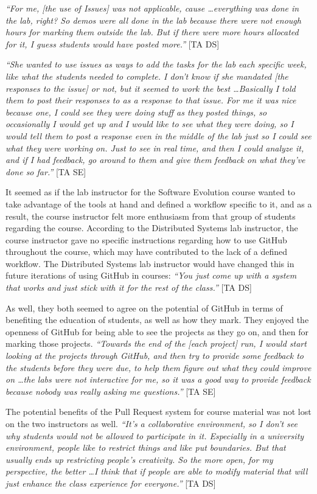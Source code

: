 \textit{``For me, [the use of Issues] was not applicable, cause \ldots everything was done in the lab, right? So demos were all done in the lab because there were not enough hours for marking them outside the lab. But if there were more hours allocated for it, I guess students would have posted more.''} [TA DS]

\textit{``She wanted to use issues as ways to add the tasks for the lab each specific week, like what the students needed to complete. I don't know if she mandated [the responses to the issue] or not, but it seemed to work the best \ldots Basically I told them to post their responses to as a response to that issue. For me it was nice because one, I could see they were doing stuff as they posted things, so occasionally I would get up and I would like to see what they were doing, so I would tell them to post a response even in the middle of the lab just so I could see what they were working on. Just to see in real time, and then I could analyze it, and if I had feedback, go around to them and give them feedback on what they've done so far.''} [TA SE]

It seemed as if the lab instructor for the Software Evolution course wanted to take advantage of the tools at hand and defined a workflow specific to it, and as a result, the course instructor felt more enthusiasm from that group of students regarding the course. According to the Distributed Systems lab instructor, the course instructor gave no specific instructions regarding how to use GitHub throughout the course, which may have contributed to the lack of a defined workflow. The Distributed Systems lab instructor would have changed this in future iterations of using GitHub in courses: \textit{``You just come up with a system that works and just stick with it for the rest of the class.''} [TA DS]

As well, they both seemed to agree on the potential of GitHub in terms of benefiting the education of students, as well as how they mark. They enjoyed the openness of GitHub for being able to see the projects as they go on, and then for marking those projects. \textit{``Towards the end of the [each project] run, I would start looking at the projects through GitHub, and then try to provide some feedback to the students before they were due, to help them figure out what they could improve on \ldots the labs were not interactive for me, so it was a good way to provide feedback because nobody was really asking me questions.''} [TA SE]

The potential benefits of the Pull Request system for course material was not lost on the two instructors as well. \textit{``It's a collaborative environment, so I don't see why students would not be allowed to participate in it. Especially in a university environment, people like to restrict things and like put boundaries. But that usually ends up restricting people's creativity. So the more open, for my perspective, the better \ldots I think that if people are able to modify material that will just enhance the class experience for everyone.''} [TA DS]

